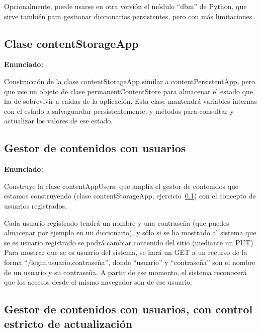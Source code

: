 Opcionalmente, puede usarse en otra versión el módulo ``dbm'' de Python, que sirve también para gestionar diccionarios persistentes, pero con más limitaciones.

\subsection{Clase contentStorageApp}
\label{subsec:contentstorageapp}

\textbf{Enunciado:}

Construcción de la clase contentStorageApp similar a contentPersistentApp, pero que use un objeto de clase permanentContentStore para almacenar el estado que ha de sobrevivir a caídas de la aplicación. Esta clase mantendrá variables internas con el estado a salvaguardar persistentemente, y métodos para consultar y actualizar los valores de ese estado.

\subsection{Gestor de contenidos con usuarios}
\label{subsec:contentappusers}

\textbf{Enunciado:}

Construye la clase contentAppUsers, que amplía el gestor de contenidos que estamos construyendo (clase contentStorageApp, ejercicio~\ref{subsec:contentstorageapp}) con el concepto de usuarios registrados.

Cada usuario registrado tendrá un nombre y una contraseña (que puedes almacenar por ejemplo en un diccionario), y sólo si se ha mostrado al sistema que se es usuario registrado se podrá cambiar contenido del sitio (mediante un PUT). Para mostrar que se es usuario del sistema, se hará un GET a un recurso de la forma ``/login,usuario,contraseña'', donde ``usuario'' y ``contraseña'' son el nombre de un usuario y su contraseña. A partir de ese momento, el sistema reconocerá que los accesos desde el mismo navegador son de ese usuario. 

\subsection{Gestor de contenidos con usuarios, con control estricto de actualización}
\label{subsec:contentappusersstrict}


